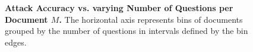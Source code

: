\begin{figure}[t]
    \centering
\caption{\textbf{Attack Accuracy vs. varying Number of Questions per Document $M$.} The horizontal axis represents bins of documents grouped by the number of questions in intervals defined by the bin edges.}
\vspace{-0.2in}
\label{fig:number_questions}
\end{figure}
